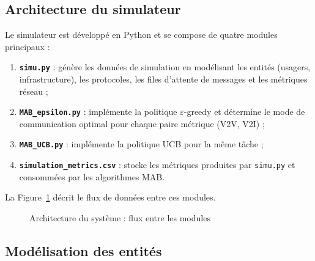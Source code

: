 \documentclass[12pt,a4paper]{article}
\begin{document}
\subsection{Architecture du simulateur}

Le simulateur est développé en Python et se compose de quatre modules principaux :

\begin{enumerate}
  \item \textbf{\texttt{simu.py}} : génère les données de simulation en modélisant
        les entités (usagers, infrastructure), les protocoles, les files d'attente
        de messages et les métriques réseau ;
  \item \textbf{\texttt{MAB\_epsilon.py}} : implémente la politique $\varepsilon$-greedy
        et détermine le mode de communication optimal pour chaque paire
        métrique (V2V, V2I) ;
  \item \textbf{\texttt{MAB\_UCB.py}} : implémente la politique UCB pour la même tâche ;
  \item \textbf{\texttt{simulation\_metrics.csv}} : stocke les métriques produites
        par \texttt{simu.py} et consommées par les algorithmes MAB.
\end{enumerate}

La Figure~\ref{fig:archi} décrit le flux de données entre ces modules.

\begin{figure}[H]
\centering
{}
\caption{Architecture du système : flux entre les modules}
\label{fig:archi}
\end{figure}

\subsection{Modélisation des entités}
\end{document}
